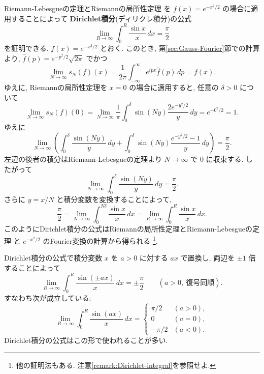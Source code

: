 \documentclass[12pt,twoside]{jarticle}
\theoremstyle{jplain}
\theoremstyle{jplain}
\theoremstyle{jplain}
\numberwithin{theorem}{section}
\numberwithin{equation}{section}
\numberwithin{figure}{section}
\numberwithin{table}{section}
\newcommand\secref[1]{第\ref{#1}節}
\newcommand\remarkref[1]{注意\ref{#1}}
\begin{document}
Riemann-Lebesgueの定理とRiemannの局所性定理
を $f(x)=e^{-x^2/2}$ の場合に適用することによって
{\bfseries Dirichlet積分}(ディリクレ積分)の公式
\[
\lim_{R\to\infty}\int_0^R \frac{\sin x}{x}\,dx = \frac{\pi}{2}
\]
を証明できる. $f(x)=e^{-x^2/2}$ とおく.
このとき, \secref{sec:Gauss-Fourier}での計算より,
$\widehat{f}(p)=e^{-p^2/2}\sqrt{2\pi}$ でかつ
\[
\lim_{N\to\infty}s_N(f)(x)
= \frac{1}{2\pi}\int_{-\infty}^\infty e^{ipx}\widehat{f}(p)\,dp
= f(x).
\]
ゆえに, Riemannの局所性定理を $x=0$ の場合に適用すると,
任意の $\delta>0$ について
\[
\lim_{N\to\infty}s_N(f)(0)
=\lim_{N\to\infty}
\frac{1}{\pi}\int_0^\delta \sin(Ny)\frac{2e^{-y^2/2}}{y}\,dy
=e^{-0^2/2}=1.
\]
ゆえに
\[
\lim_{N\to\infty}
\left(
 \int_0^\delta \frac{\sin(Ny)}{y}\,dy
 + \int_0^\delta \sin(Ny)\frac{e^{-y^2/2}-1}{y}\,dy
\right)
=\frac{\pi}{2}.
\]
左辺の後者の積分はRiemann-Lebesgueの定理より $N\to\infty$ で $0$ に収束する.
したがって
\[
\lim_{N\to\infty}\int_0^\delta \frac{\sin(Ny)}{y}\,dy = \frac{\pi}{2}.
\]
さらに $y=x/N$ と積分変数を変換することによって,
\[
\frac{\pi}{2}
=\lim_{N\to\infty}\int_0^{N\delta} \frac{\sin x}{x}\,dx
= \lim_{R\to\infty}\int_0^R \frac{\sin x}{x}\,dx.
\]
このようにDirichlet積分の公式はRiemannの局所性定理とRiemann-Lebesgueの定理
と $e^{-x^2/2}$ のFourier変換の計算から得られる%
\footnote{他の証明法もある. \remarkref{remark:Dirichlet-integral}を参照せよ.}.

Dirichlet積分の公式で積分変数 $x$ を $a>0$ に対する $ax$ で置換し,
両辺を $\pm 1$ 倍することによって
\[
\lim_{R\to\infty}\int_0^R \frac{\sin(\pm ax)}{x}\,dx = \pm\frac{\pi}{2}
\qquad (a>0,\ \text{復号同順}).
\]
すなわち次が成立している:
\[
\lim_{R\to\infty}\int_0^R \frac{\sin(ax)}{x}\,dx
=
\begin{cases}
\pi/2  & (a>0), \\
0      & (a=0), \\
-\pi/2 & (a<0).
\end{cases}
\]
Dirichlet積分の公式はこの形で使われることが多い.
\end{document}
